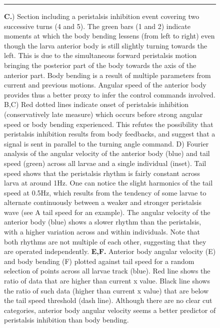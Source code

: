\documentclass[10pt,a4paper]{article}
\begin{document}
\begin{figure}[t!]
\ContinuedFloat
\caption{
{\bf C.}) Section including a peristalsis inhibition event covering two successive turns (4 and 5). The green bars (1 and 2) indicate moments at which the body bending lessens (from left to right) even though the larva anterior body is still slightly turning towards the left. This is due to the simultaneous forward peristalsis motion bringing the posterior part of the body towards the axis of the anterior part. Body bending is a result of multiple parameters from current and previous motions. Angular speed of the anterior body provides thus a better proxy to infer the control commands involved. B,C) Red dotted lines indicate onset of peristalsis inhibition (conservatively late measure) which occurs before strong angular speed or body bending experienced. This refutes the possibility that peristalsis inhibition results from body feedbacks, and suggest that a signal is sent in parallel to the turning angle command. D) Fourier analysis of the angular velocity of the anterior body (blue) and tail speed (green) across all larvae and a single individual (inset). Tail speed shows that the peristalsis rhythm is fairly constant across larva at around 1Hz. One can notice the slight harmonics of the tail speed at 0.5Hz, which results from the tendency of some larvae to alternate continuously between a weaker and stronger peristalsis wave (see A tail speed for an example). The angular velocity of the anterior body (blue) shows a slower rhythm than the peristalsis, with a higher variation across and within individuals. Note that both rhythms are not multiple of each other, suggesting that they are operated independently.
{\bf  E,F.} Anterior body angular velocity (E) and body bending (F) plotted against tail speed for a random selection of points across all larvae track (blue). Red line shows the ratio of data that are higher than current x value. Black line shows the ratio of such data (higher than current x value) that are below the tail speed threshold (dash line). Although there are no clear cut categories, anterior body angular velocity seems a better predictor of peristalsis inhibition than body bending.
}
\hrule
\end{figure}
\end{document}

